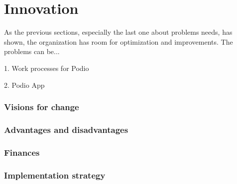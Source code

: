 \part{Innovation}
As the previous sections, especially the last one about problems needs, has shown, the organization has room for optimization and improvements. The problems can be...

1. Work processes for Podio

2. Podio App

\section{Visions for change}

\section{Advantages and disadvantages}

\section{Finances}

\section{Implementation strategy}


